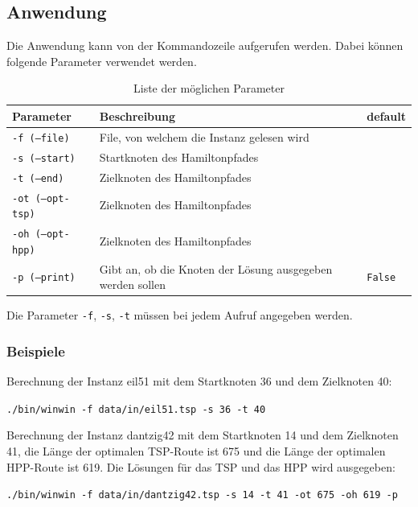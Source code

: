 \documentclass[11pt,a4paper]{article}
\begin{document}
\subsection{Anwendung}
Die Anwendung kann von der Kommandozeile aufgerufen werden. Dabei können folgende Parameter verwendet werden.

\begin{table}[H]
        \centering
        \begin{tabular}{| l | l | l |}
            \hline
            \textbf{Parameter}          & \textbf{Beschreibung}                                         & \textbf{default}      \\ \hline
            \texttt{-f (--file)}        & File, von welchem die Instanz gelesen wird                    &                       \\ \hline
            \texttt{-s (--start)}       & Startknoten des Hamiltonpfades                                &                       \\ \hline
            \texttt{-t (--end)}         & Zielknoten des Hamiltonpfades                                 &                       \\ \hline
            \texttt{-ot (--opt-tsp)}    & Zielknoten des Hamiltonpfades                                 &                       \\ \hline
            \texttt{-oh (--opt-hpp)}    & Zielknoten des Hamiltonpfades                                 &                       \\ \hline
            \texttt{-p (--print)}       & Gibt an, ob die Knoten der Lösung ausgegeben werden sollen    & \texttt{False}        \\ \hline
        \end{tabular}
        \caption{Liste der möglichen Parameter}
        \label{tab:parameter}
\end{table}

Die Parameter \texttt{-f}, \texttt{-s}, \texttt{-t} müssen bei jedem Aufruf angegeben werden.

\subsubsection{Beispiele}
Berechnung der Instanz eil51 mit dem Startknoten 36 und dem Zielknoten 40:
\begin{flushleft}
\texttt{./bin/winwin -f data/in/eil51.tsp -s 36 -t 40}
\end{flushleft}

Berechnung der Instanz dantzig42 mit dem Startknoten 14 und dem Zielknoten 41, die Länge der optimalen TSP-Route ist 675 und die Länge der optimalen HPP-Route ist 619. Die Lösungen für das TSP und das HPP wird ausgegeben:
\begin{flushleft}
\texttt{./bin/winwin -f data/in/dantzig42.tsp -s 14 -t 41 -ot 675 -oh 619 -p}
\end{flushleft}
\end{document}
